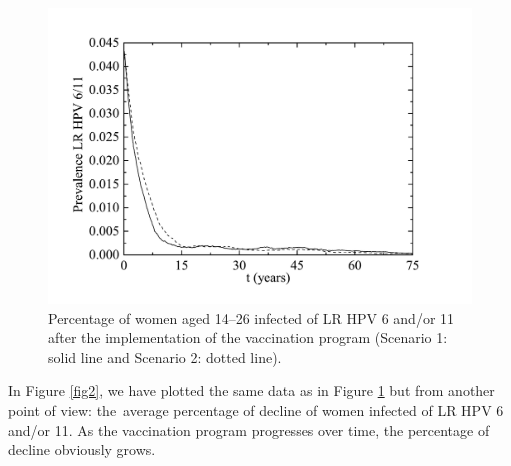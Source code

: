 \begin{figure}[H]
	\centering
	\includegraphics[scale=0.4]{FigLRwomen.pdf}
	\vspace{-12pt}
	\caption{Percentage of women aged 14--26 infected of LR HPV 6 and/or 11 after the 
		implementation of the vaccination program (Scenario 1: solid line and Scenario 2: dotted line).}
	\label{fig:lrmujeres}
\end{figure}

In Figure \ref{fig2}, we have plotted the same data as in Figure \ref{fig:lrmujeres} but from another point of view: the~average percentage of decline of women infected of LR HPV 6 and/or 11. As the vaccination program progresses over time, the percentage of decline obviously grows. 
\vspace{-24pt}


